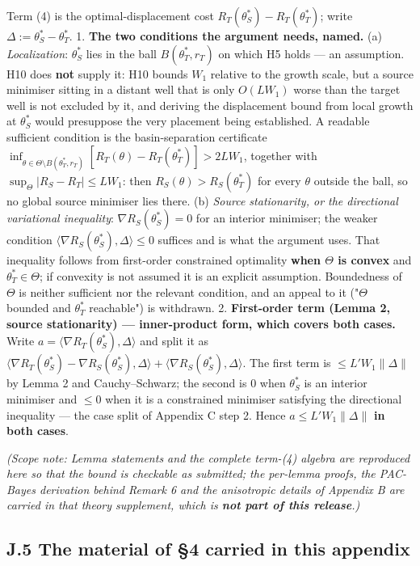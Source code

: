 \documentclass[pdflatex,sn-mathphys-ay]{sn-jnl}
\begin{document}
Term (4) is the optimal-displacement cost $R_T(\theta^*_S)-R_T(\theta^*_T)$; write $\Delta := \theta^*_S-\theta^*_T$. 1. \textbf{The two conditions the argument needs, named.} (a) \emph{Localization}: $\theta^*_S$ lies in the ball $B(\theta^*_T,r_T)$ on which H5 holds --- an assumption. H10 does \textbf{not} supply it: H10 bounds $W_1$ relative to the growth scale, but a source minimiser sitting in a distant well that is only $O(LW_1)$ worse than the target well is not excluded by it, and deriving the displacement bound from local growth at $\theta^*_S$ would presuppose the very placement being established. A readable sufficient condition is the basin-separation certificate $\inf_{\theta\in\Theta\setminus B(\theta^*_T,r_T)}[R_T(\theta)-R_T(\theta^*_T)]>2LW_1$, together with $\sup_\Theta|R_S-R_T|\le LW_1$: then $R_S(\theta)>R_S(\theta^*_T)$ for every $\theta$ outside the ball, so no global source minimiser lies there. (b) \emph{Source stationarity, or the directional variational inequality}: $\nabla R_S(\theta^*_S)=0$ for an interior minimiser; the weaker condition $\langle\nabla R_S(\theta^*_S),\Delta\rangle\le0$ suffices and is what the argument uses. That inequality follows from first-order constrained optimality \textbf{when $\Theta$ is convex} and $\theta^*_T\in\Theta$; if convexity is not assumed it is an explicit assumption. Boundedness of $\Theta$ is neither sufficient nor the relevant condition, and an appeal to it ("$\Theta$ bounded and $\theta^*_T$ reachable") is withdrawn. 2. \textbf{First-order term (Lemma 2, source stationarity) --- inner-product form, which covers both cases.} Write $a=\langle\nabla R_T(\theta^*_S),\Delta\rangle$ and split it as $\langle\nabla R_T(\theta^*_S)-\nabla R_S(\theta^*_S),\Delta\rangle+\langle\nabla R_S(\theta^*_S),\Delta\rangle$. The first term is $\le L'W_1\|\Delta\|$ by Lemma 2 and Cauchy--Schwarz; the second is $0$ when $\theta^*_S$ is an interior minimiser and $\le0$ when it is a constrained minimiser satisfying the directional inequality --- the case split of Appendix C step 2. Hence $a\le L'W_1\|\Delta\|$ \textbf{in both cases}.

\emph{(Scope note: Lemma statements and the complete term-(4) algebra are reproduced here so that the bound is checkable as submitted; the per-lemma proofs, the PAC-Bayes derivation behind Remark 6 and the anisotropic details of Appendix B are carried in that theory supplement, which is \textbf{not part of this release}.)}

\subsection*{J.5 The material of \S{}4 carried in this appendix}
\end{document}
